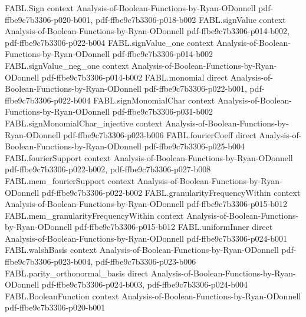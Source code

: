 \begin{theorem}
\label{FABL.coeff_middleLayerBinomialPolynomial}
\leanok
{}
\proofstep
  {FABL.Sign}
  {context}
  {Analysis-of-Boolean-Functions-by-Ryan-ODonnell}
  {pdf-ffbe9c7b3306-p020-b001,
    pdf-ffbe9c7b3306-p018-b002}
\proofstep
  {FABL.signValue}
  {context}
  {Analysis-of-Boolean-Functions-by-Ryan-ODonnell}
  {pdf-ffbe9c7b3306-p014-b002,
    pdf-ffbe9c7b3306-p022-b004}
\proofstep
  {FABL.signValue_one}
  {context}
  {Analysis-of-Boolean-Functions-by-Ryan-ODonnell}
  {pdf-ffbe9c7b3306-p014-b002}
\proofstep
  {FABL.signValue_neg_one}
  {context}
  {Analysis-of-Boolean-Functions-by-Ryan-ODonnell}
  {pdf-ffbe9c7b3306-p014-b002}
\proofstep
  {FABL.monomial}
  {direct}
  {Analysis-of-Boolean-Functions-by-Ryan-ODonnell}
  {pdf-ffbe9c7b3306-p022-b001,
    pdf-ffbe9c7b3306-p022-b004}
\proofstep
  {FABL.signMonomialChar}
  {context}
  {Analysis-of-Boolean-Functions-by-Ryan-ODonnell}
  {pdf-ffbe9c7b3306-p031-b002}
\proofstep
  {FABL.signMonomialChar_injective}
  {context}
  {Analysis-of-Boolean-Functions-by-Ryan-ODonnell}
  {pdf-ffbe9c7b3306-p023-b006}
\proofstep
  {FABL.fourierCoeff}
  {direct}
  {Analysis-of-Boolean-Functions-by-Ryan-ODonnell}
  {pdf-ffbe9c7b3306-p025-b004}
\proofstep
  {FABL.fourierSupport}
  {context}
  {Analysis-of-Boolean-Functions-by-Ryan-ODonnell}
  {pdf-ffbe9c7b3306-p022-b002,
    pdf-ffbe9c7b3306-p027-b008}
\proofstep
  {FABL.mem_fourierSupport}
  {context}
  {Analysis-of-Boolean-Functions-by-Ryan-ODonnell}
  {pdf-ffbe9c7b3306-p022-b002}
\proofstep
  {FABL.granularityFrequencyWithin}
  {context}
  {Analysis-of-Boolean-Functions-by-Ryan-ODonnell}
  {pdf-ffbe9c7b3306-p015-b012}
\proofstep
  {FABL.mem_granularityFrequencyWithin}
  {context}
  {Analysis-of-Boolean-Functions-by-Ryan-ODonnell}
  {pdf-ffbe9c7b3306-p015-b012}
\proofstep
  {FABL.uniformInner}
  {direct}
  {Analysis-of-Boolean-Functions-by-Ryan-ODonnell}
  {pdf-ffbe9c7b3306-p024-b001}
\proofstep
  {FABL.walshBasis}
  {context}
  {Analysis-of-Boolean-Functions-by-Ryan-ODonnell}
  {pdf-ffbe9c7b3306-p023-b004,
    pdf-ffbe9c7b3306-p023-b006}
\proofstep
  {FABL.parity_orthonormal_basis}
  {direct}
  {Analysis-of-Boolean-Functions-by-Ryan-ODonnell}
  {pdf-ffbe9c7b3306-p024-b003,
    pdf-ffbe9c7b3306-p024-b004}
\proofstep
  {FABL.BooleanFunction}
  {context}
  {Analysis-of-Boolean-Functions-by-Ryan-ODonnell}
  {pdf-ffbe9c7b3306-p020-b001}

\end{theorem}
